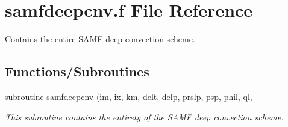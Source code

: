 \hypertarget{samfdeepcnv_8f}{}\section{samfdeepcnv.\+f File Reference}
\label{samfdeepcnv_8f}


Contains the entire S\+A\+MF deep convection scheme.  


\subsection*{Functions/\+Subroutines}
\textbf{ }\par
\begin{DoxyCompactItemize}
\item 
subroutine \hyperlink{group___s_a_m_f_ga244f59e0ba7be1c351a58ddda611173e}{samfdeepcnv} (im, ix, km, delt, delp, prslp, psp, phil, ql,
\begin{DoxyCompactList}\small\item\em This subroutine contains the entirety of the S\+A\+MF deep convection scheme. \end{DoxyCompactList}\end{DoxyCompactItemize}

